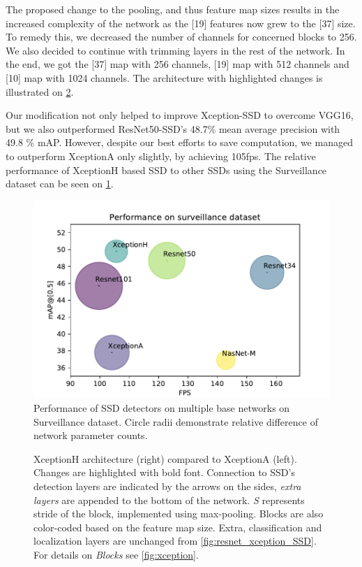 The proposed change to the pooling, and thus feature map sizes results in the increased complexity of the network as the [19] features now grew to the [37] size. To remedy this, we decreased the number of channels for concerned blocks to 256. We also decided to continue with trimming layers in the rest of the network. In the end, we got the [37] map with 256 channels, [19] map with 512 channels and [10] map with 1024 channels. The architecture with highlighted changes is illustrated on \cref{fig:xceptionH_SSD}. 

Our modification not only helped to improve Xception-SSD to overcome VGG16, but we also outperformed ResNet50-SSD's 48.7\% mean average precision with 49.8 \% mAP. However, despite our best efforts to save computation, we managed to outperform XceptionA only slightly, by achieving 105fps. The relative performance of XceptionH based SSD to other SSDs using the Surveillance dataset can be seen on \cref{fig:surv_perf}.

\begin{figure}
    \centering
    \includegraphics[width=\textwidth]{img/fps_map_s}
    \caption[Performance of SSD with multiple base networks on Surveillance dataset]{Performance of SSD detectors on multiple base networks on Surveillance dataset. Circle radii demonstrate relative difference of network parameter counts.} 
    \label{fig:surv_perf}
\end{figure}

\begin{figure}
    \centering
    \xceptionSSD
    \caption[XceptionH-SSD]%
    {XceptionH architecture (right) compared to XceptionA (left). Changes are highlighted with bold font. Connection to SSD's detection layers are indicated by the arrows on the sides, \textit{extra layers} are appended to the bottom of the network.  \textit{S} represents stride of the block, implemented using max-pooling. Blocks are also color-coded based on the feature map size. Extra, classification and localization layers are unchanged from \cref{fig:resnet_xception_SSD}. For details on \textit{Blocks} see \cref{fig:xception}.} 
    \label{fig:xceptionH_SSD}
\end{figure}


